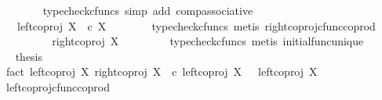 \begin{isabellebody}
\ \ \ \ \ \ \isamarkupfalse%
\ {\isacharparenleft}{\kern0pt}typecheck{\isacharunderscore}{\kern0pt}cfuncs{\isacharcomma}{\kern0pt}\ simp\ add{\isacharcolon}{\kern0pt}\ comp{\isacharunderscore}{\kern0pt}associative{}{\isacharparenright}{\kern0pt}\isanewline
\ \ \ \ \isamarkupfalse%
\ \isamarkupfalse%
\ {\isachardoublequoteopen}{\isachardot}{\kern0pt}{\isachardot}{\kern0pt}{\isachardot}{\kern0pt}\ {\isacharequal}{\kern0pt}\ {\isacharparenleft}{\kern0pt}left{\isacharunderscore}{\kern0pt}coproj\ X\ {\isasymemptyset}{\isacharparenright}{\kern0pt}\ {\isasymcirc}\isactrlsub c\ {\isasymalpha}\isactrlbsub X\isactrlesub {\isachardoublequoteclose}\isanewline
\ \ \ \ \ \ \isamarkupfalse%
\ {\isacharparenleft}{\kern0pt}typecheck{\isacharunderscore}{\kern0pt}cfuncs{\isacharcomma}{\kern0pt}\ metis\ right{\isacharunderscore}{\kern0pt}coproj{\isacharunderscore}{\kern0pt}cfunc{\isacharunderscore}{\kern0pt}coprod{\isacharparenright}{\kern0pt}\isanewline
\ \ \ \ \isamarkupfalse%
\ \isamarkupfalse%
\ {\isachardoublequoteopen}{\isachardot}{\kern0pt}{\isachardot}{\kern0pt}{\isachardot}{\kern0pt}\ {\isacharequal}{\kern0pt}\ right{\isacharunderscore}{\kern0pt}coproj\ X\ {\isasymemptyset}{\isachardoublequoteclose}\isanewline
\ \ \ \ \ \ \isamarkupfalse%
\ {\isacharparenleft}{\kern0pt}typecheck{\isacharunderscore}{\kern0pt}cfuncs{\isacharcomma}{\kern0pt}\ metis\ initial{\isacharunderscore}{\kern0pt}func{\isacharunderscore}{\kern0pt}unique{\isacharparenright}{\kern0pt}\isanewline
\ \ \ \ \isamarkupfalse%
\ \isamarkupfalse%
\ {\isacharquery}{\kern0pt}thesis\isacommand{{\isachardot}{\kern0pt}}\isamarkupfalse%
\isanewline
\ \ \isamarkupfalse%
\isanewline
\ \ \isamarkupfalse%
\ \isamarkupfalse%
\ fact{}{\isacharcolon}{\kern0pt}\ {\isachardoublequoteopen}{\isacharparenleft}{\kern0pt}left{\isacharunderscore}{\kern0pt}coproj\ X\ {\isasymemptyset}{\isacharparenright}{\kern0pt}{\isasymamalg}{\isacharparenleft}{\kern0pt}right{\isacharunderscore}{\kern0pt}coproj\ X\ {\isasymemptyset}{\isacharparenright}{\kern0pt}\ {\isasymcirc}\isactrlsub c\ left{\isacharunderscore}{\kern0pt}coproj\ X\ {\isasymemptyset}\ {\isacharequal}{\kern0pt}\ left{\isacharunderscore}{\kern0pt}coproj\ X\ {\isasymemptyset}{\isachardoublequoteclose}\isanewline
\ \ \ \ \isamarkupfalse%
\ left{\isacharunderscore}{\kern0pt}coproj{\isacharunderscore}{\kern0pt}cfunc{\isacharunderscore}{\kern0pt}coprod\ \isamarkupfalse%

\end{isabellebody}
